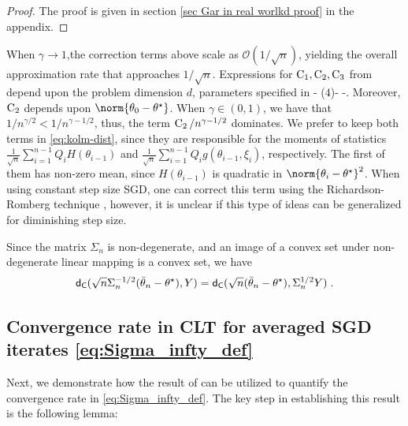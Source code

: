 \begin{proof}
The proof is given in section \ref{sec Gar in real worlkd proof} in the appendix.
\end{proof}
When \( \gamma \to 1 \),the correction terms above scale as \(\mathcal{O}(1/\sqrt{n}) \), yielding the overall approximation rate that approaches \( 1/\sqrt{n} \). Expressions for $\operatorname{C}_1, \operatorname{C}_2, \operatorname{C}_3$ from  depend upon the problem dimension $d$, parameters specified in  - ($4$)- -. Moreover, $\operatorname{C}_2$ depends upon $\norm{\theta_0-\thetas}$. When $\gamma \in (0,1)$, we have that $1/n^{\gamma/2} < 1/n^{\gamma-1/2}$, thus, the term $\operatorname{C}_2/n^{\gamma-1/2}$ dominates. We prefer to keep both terms in \eqref{eq:kolm-dist}, since they are responsible for the moments of statistics $\frac{1}{\sqrt{n}}\sum_{i=1}^{n-1}Q_iH(\theta_{i-1})$ and $\frac{1}{\sqrt{n}}\sum_{i=1}^{n-1}Q_ig(\theta_{i-1}, \xi_i)$, respectively. The first of them has non-zero mean, since $H(\theta_{i-1})$ is quadratic in $\norm{\theta_i-\thetas}^2$. When using constant step size SGD, one can correct this term using the Richardson-Romberg technique \cite{durmus2020biassgd,SheshukovaICLR}, however, it is unclear if this type of ideas can be generalized for diminishing step size.

\begin{remark}
\label{rem:remark_1}
Since the matrix $\Sigma_n$ is non-degenerate, and an image of a convex set under non-degenerate linear mapping is a convex set, we have 
\begin{align}
\mathsf{d}_{\mathsf{C}}(\sqrt{n}\Sigma_n^{-1/2}(\bar\theta_n -\theta^\star), Y) = \mathsf{d}_{\mathsf{C}}(\sqrt{n}(\bar \theta_n -\theta^\star), \Sigma_n^{1/2} Y)\;.
\end{align}
\end{remark}

\subsection{Convergence rate in CLT for averaged SGD iterates \eqref{eq:Sigma_infty_def}}
Next, we demonstrate how the result of  can be utilized to quantify the convergence rate in \eqref{eq:Sigma_infty_def}. The key step in establishing this result is the following lemma:

